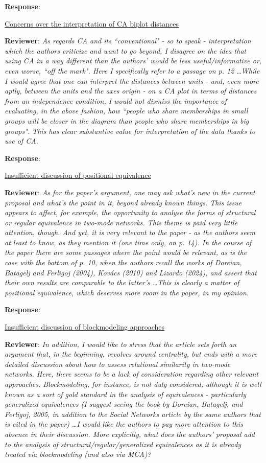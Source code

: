\documentclass{article}
\begin{document}
\textbf{Response}:

\underline{Concerns over the interpretation of CA biplot distances}

\textbf{Reviewer}: \textit{As regards CA and its ``conventional" - so to speak - interpretation which the authors criticize and want to go beyond, I disagree on the idea that using CA in a way different than the authors' would be less useful/informative or, even worse, ``off the mark". Here I specifically refer to a passage on p. 12 \ldots While I would agree that one can interpret the distances between units - and, even more aptly, between the units and the axes origin - on a CA plot in terms of distances from an independence condition, I would not dismiss the importance of evaluating, in the above fashion, how ``people who share memberships in small groups will be closer in the diagram than people who share memberships in big groups". This has clear substantive value for interpretation of the data thanks to use of CA.}

\textbf{Response}:

\underline{Insufficient discussion of positional equivalence}

\textbf{Reviewer}: \textit{As for the paper's argument, one may ask what's new in the current proposal and what's the point in it, beyond already known things. This issue appears to affect, for example, the opportunity to analyse the forms of structural or regular equivalence in two-mode networks. This theme is paid very little attention, though. And yet, it is very relevant to the paper - as the authors seem at least to know, as they mention it (one time only, on p. 14). In the course of the paper there are some passages where the point would be relevant, as is the case with the bottom of p. 10, when the authors recall the works of Doreian, Batagelj and Ferligoj (2004), Kovács (2010) and Lizardo (2024), and assert that their own results are comparable to the latter's \ldots This is clearly a matter of positional equivalence, which deserves more room in the paper, in my opinion.}

\textbf{Response}:

\underline{Insufficient discussion of blockmodeling approaches}

\textbf{Reviewer}: \textit{In addition, I would like to stress that the article sets forth an argument that, in the beginning, revolves around centrality, but ends with a more detailed discussion about how to assess relational similarity in two-mode networks. Here, there seems to be a lack of consideration regarding other relevant approaches. Blockmodeling, for instance, is not duly considered, although it is well known as a sort of gold standard in the analysis of equivalences - particularly generalized equivalences (I suggest seeing the book by Doreian, Batagelj, and Ferligoj, 2005, in addition to the Social Networks article by the same authors that is cited in the paper) \ldots I would like the authors to pay more attention to this absence in their discussion. More explicitly, what does the authors' proposal add to the analysis of structural/regular/generalized equivalences as it is already treated via blockmodeling (and also via MCA)?}
\end{document}
